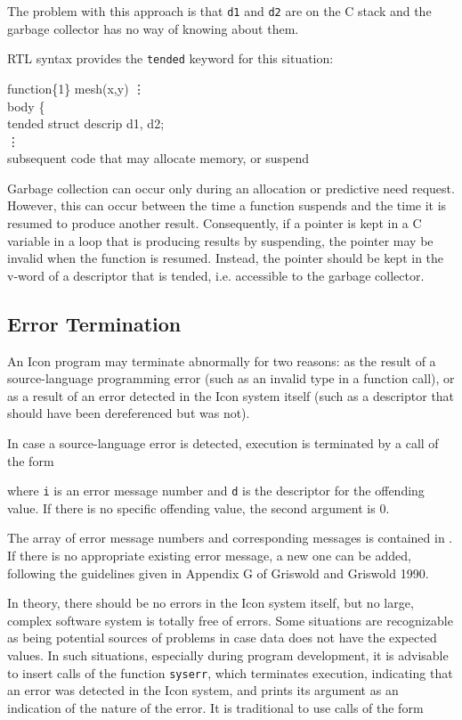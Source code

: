 \noindent
The problem with this approach is that \texttt{d1} and \texttt{d2} are on
the C stack and the garbage collector has no way of knowing about them.

RTL syntax provides the \texttt{tended} keyword for this situation:

\begin{iconcode}
function\{1\} mesh(x,y)
\> \vdots \\
body \{\\
\>  tended struct descrip d1, d2; \\
\>  \vdots \\
\>  subsequent code that may allocate memory, or suspend
\end{iconcode}

Garbage collection can occur only during an allocation or predictive need
request. However, this can occur between the time
a function suspends and the time it is resumed to produce another
result. Consequently, if a pointer is kept in a C variable in a loop
that is producing results by suspending, the pointer may be invalid
when the function is resumed. Instead, the pointer should be kept in
the v-word of a descriptor that is tended, i.e. accessible to the garbage
collector.

\subsection{Error Termination}

An Icon program may terminate abnormally for two reasons: as the
result of a source-language programming error (such as an invalid type
in a function call), or as a result of an error detected in the Icon
system itself (such as a descriptor that should have been dereferenced
but was not).

In case a source-language error is detected, execution is terminated
by a call of the form


\noindent where \texttt{i} is an error message number and \texttt{d} is the
descriptor for the offending value. If there is no specific offending
value, the second argument is 0.

The array of error message numbers and corresponding messages is
contained in . If there is no appropriate existing error
message, a new one can be added, following the guidelines given in
Appendix G of Griswold and Griswold 1990.

In theory, there should be no errors in the Icon system itself, but no
large, complex software system is totally free of errors. Some situations
are recognizable as being potential sources of problems in case data does
not have the expected values. In such situations, especially during program
development, it is advisable to insert calls of the function
\texttt{syserr}, which terminates execution, indicating that an error was
detected in the Icon system, and prints its argument as an indication of
the nature of the error. It is traditional to use calls of the form

